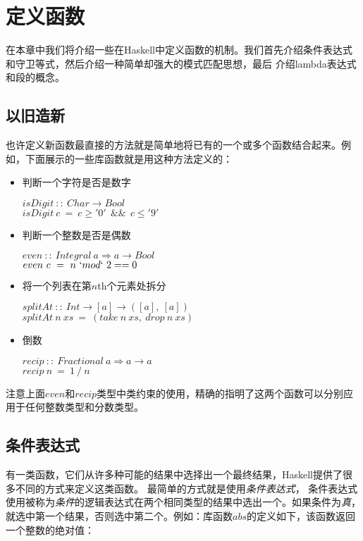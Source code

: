 \chapter{定义函数}
在本章中我们将介绍一些在Haskell中定义函数的机制。我们首先介绍条件表达式和守卫等式，然后介绍一种简单却强大的模式匹配思想，最后
介绍lambda表达式和段的概念。

\section{以旧造新}
也许定义新函数最直接的方法就是简单地将已有的一个或多个函数结合起来。例如，下面展示的一些库函数就是用这种方法定义的：

\begin{itemize}
\item 判断一个字符是否是数字

\hspace*{1cm} $isDigit~::~Char \rightarrow Bool$\\
\hspace*{1cm} $isDigit~c~=~c \geq '0'~~\&\&~~c \leq '9'$

\item 判断一个整数是否是偶数

\hspace*{1cm} $even~::~Integral~a \Rightarrow a \rightarrow Bool$\\
\hspace*{1cm} $even~c~=~n~`mod`~2 == 0$

\item 将一个列表在第$n$th个元素处拆分

\hspace*{1cm} $splitAt~::~Int \rightarrow [a] \rightarrow ([a],~[a])$\\
\hspace*{1cm} $splitAt~n~xs~=~(take~n~xs,~drop~n~xs)$

\item 倒数

\hspace*{1cm} $recip~::~Fractional~a \Rightarrow a \rightarrow a$\\
\hspace*{1cm} $recip~n~=~1~/~n$

\end{itemize}

注意上面$even$和$recip$类型中类约束的使用，精确的指明了这两个函数可以分别应用于任何整数类型和分数类型。

\section{条件表达式}
有一类函数，它们从许多种可能的结果中选择出一个最终结果，Haskell提供了很多不同的方式来定义这类函数。
最简单的方式就是使用\textit{条件表达式}，
条件表达式使用被称为\textit{条件}的逻辑表达式在两个相同类型的结果中选出一个。如果条件为\textit{真}，就选中第一个结果，否则选中第二个。例如：库函数$abs$的定义如下，该函数返回一个整数的绝对值：

